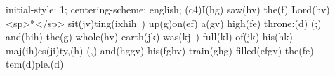 initial-style: 1;
centering-scheme: english;
(c4)I(hg) saw(hv) the(f) Lord(hv) <sp>*</sp> sit(jv)ting(ixhih~) up(g)on(ef) a(gv) high(fe) throne:(d) (;) and(hih) the(g) whole(hv) earth(jk) was(kj~) full(kl) of(jk) his(hk) maj(ih)es(ji)ty,(h) (,) and(hggv) his(fghv) train(ghg) filled(efgv) the(fe) tem(d)ple.(d)
